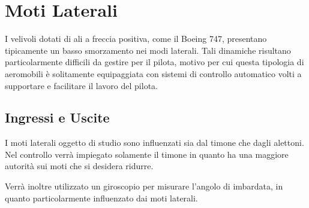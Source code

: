 \section{Moti Laterali}
I velivoli dotati di ali a freccia positiva, come il Boeing 747, presentano tipicamente un basso smorzamento nei modi laterali.
Tali dinamiche risultano particolarmente difficili da gestire per il pilota, motivo per cui questa tipologia di aeromobili è solitamente equipaggiata con sistemi di controllo automatico volti a supportare e facilitare il lavoro del pilota.

\subsection{Ingressi e Uscite}

I moti laterali oggetto di studio sono influenzati sia dal timone che dagli alettoni. Nel controllo verrà impiegato solamente il timone in quanto ha una maggiore autorità sui moti che si desidera ridurre.

Verrà inoltre utilizzato un giroscopio per misurare l'angolo di imbardata, in quanto particolarmente influenzato dai moti laterali.
\begin{figure}[H]
    \centering
\end{figure}

